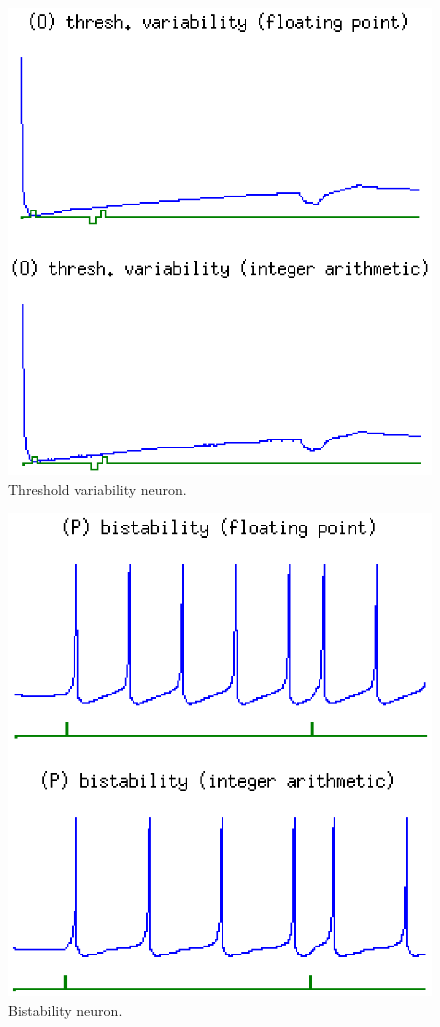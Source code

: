 \documentclass[journal]{./sty/IEEEtran}
\begin{document}
\begin{figure}
\centering
\includegraphics[scale=0.6]{imgs/izh_thresh_variability}
\caption{Threshold variability neuron.}
\end{figure}

\begin{figure}
\centering
\includegraphics[scale=0.6]{imgs/izh_bistability}
\caption{Bistability neuron.}
\end{figure}
\end{document}
